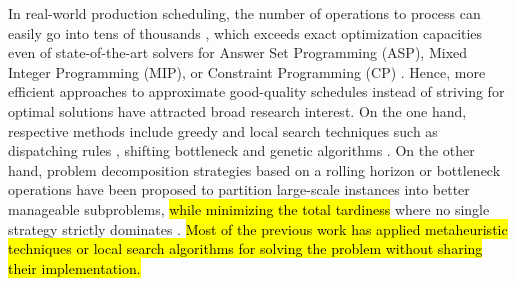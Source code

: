 \documentclass{tlp} %
\begin{document}

In real-world production scheduling, the number of operations to process can easily go
into tens of thousands \citep{coltep19a,kohakamo20a,kotakoscge21a}, which exceeds exact
optimization capacities even of state-of-the-art solvers for Answer Set Programming (ASP),
Mixed Integer Programming (MIP), or Constraint Programming (CP)
\citep{daneshamooz2021mathematical,francescutto2021solving,shi2021solving}.
Hence, more efficient approaches to approximate good-quality schedules 
instead of striving for optimal solutions have attracted broad research interest.
On the one hand, respective methods include greedy and local search techniques such as
dispatching rules \citep{blackstone1982state}, shifting bottleneck \citep{adams1988shifting} and
genetic algorithms \citep{pezzella2008genetic}.
On the other hand, problem decomposition strategies based on a
rolling horizon \citep{singer2001decomposition,liu2008prediction} or
bottleneck operations \citep{zhang2010hybrid,zhai2014decomposition} 
have been proposed to partition large-scale instances into better manageable subproblems, \hl{while minimizing the total tardiness}
where no single strategy strictly dominates \citep{ovacik2012decomposition}. \hl{Most of the previous work has applied metaheuristic techniques or local search algorithms for solving the problem without sharing their implementation.}
\end{document}
